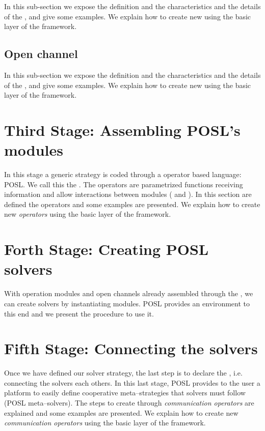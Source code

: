 \documentclass[a4paper]{book} %
\newcommand{\posl}{{\sc POSL}}
\begin{document}
In this sub-section we expose the definition and the characteristics and the details of the \om, and give some examples. We explain how to create new \oms{} using the basic layer of the framework.

\subsection{Open channel}

In this sub-section we expose the definition and the characteristics and the details of the \opch, and give some examples. We explain how to create new \opchs{} using the basic layer of the framework.

\section{Third Stage: Assembling \posl's modules}

In this stage a generic strategy is coded through a operator based language: \posl. We call this the \cstr. The operators are parametrized functions receiving information and allow interactions between modules (\oms{} and \opchs). In this section are defined the operators and some examples are presented. We explain how to create new \textit{operators} using the basic layer of the framework.

\section{Forth Stage: Creating \posl{} solvers}

With operation modules and open channels already assembled through the \cstr{}, we can create solvers by instantiating modules. \posl{} provides an environment to this end and we present the procedure to use it. 

\section{Fifth Stage: Connecting the solvers}

Once we have defined our solver strategy, the last step is to declare the \commchs, i.e. connecting the solvers each others. In this last stage, \posl{} provides to the user a platform to easily define cooperative meta--strategies that solvers must follow (\posl{} meta--solvers). The steps to create \commchs{} through \textit{communication operators} are explained and some examples are presented. We explain how to create new \textit{communication operators} using the basic layer of the framework.
\end{document}
